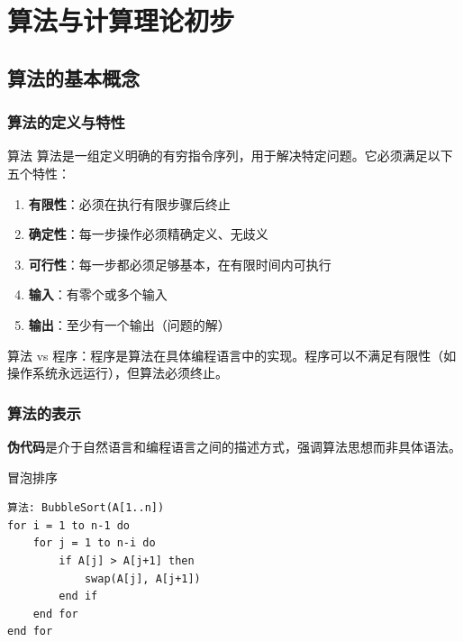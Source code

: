 \chapter{算法与计算理论初步}

\section{算法的基本概念}

\subsection{算法的定义与特性}

\begin{mydefinition}{算法}
算法是一组定义明确的有穷指令序列，用于解决特定问题。它必须满足以下五个特性：
\begin{enumerate}[leftmargin=*]
    \item \textbf{有限性}：必须在执行有限步骤后终止
    \item \textbf{确定性}：每一步操作必须精确定义、无歧义
    \item \textbf{可行性}：每一步都必须足够基本，在有限时间内可执行
    \item \textbf{输入}：有零个或多个输入
    \item \textbf{输出}：至少有一个输出（问题的解）
\end{enumerate}
\end{mydefinition}

算法 vs 程序：程序是算法在具体编程语言中的实现。程序可以不满足有限性（如操作系统永远运行），但算法必须终止。

\subsection{算法的表示}

\textbf{伪代码}是介于自然语言和编程语言之间的描述方式，强调算法思想而非具体语法。

\begin{myalgorithm}{冒泡排序}
\begin{verbatim}
算法: BubbleSort(A[1..n])
for i = 1 to n-1 do
    for j = 1 to n-i do
        if A[j] > A[j+1] then
            swap(A[j], A[j+1])
        end if
    end for
end for
\end{verbatim}
\end{myalgorithm}


